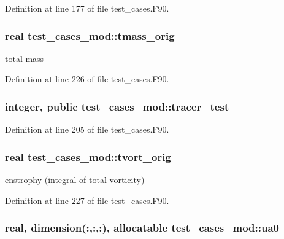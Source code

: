 Definition at line 177 of file test\-\_\-cases.\-F90.

\subsubsection[{tmass\-\_\-orig}]{\setlength{\rightskip}{0pt plus 5cm}real test\-\_\-cases\-\_\-mod\-::tmass\-\_\-orig\hspace{0.3cm}{\ttfamily [private]}}\label{classtest__cases__mod_af40da1fd7e6753224232eb5f50752dbf}


total mass 



Definition at line 226 of file test\-\_\-cases.\-F90.

\subsubsection[{tracer\-\_\-test}]{\setlength{\rightskip}{0pt plus 5cm}integer, public test\-\_\-cases\-\_\-mod\-::tracer\-\_\-test}\label{classtest__cases__mod_a045ac76cf8976a508e18b8f03ba2f57f}


Definition at line 205 of file test\-\_\-cases.\-F90.

\subsubsection[{tvort\-\_\-orig}]{\setlength{\rightskip}{0pt plus 5cm}real test\-\_\-cases\-\_\-mod\-::tvort\-\_\-orig\hspace{0.3cm}{\ttfamily [private]}}\label{classtest__cases__mod_a9e6b5dada32091330827cadf573e240a}


enstrophy (integral of total vorticity) 



Definition at line 227 of file test\-\_\-cases.\-F90.

\subsubsection[{ua0}]{\setlength{\rightskip}{0pt plus 5cm}real, dimension(\-:,\-:,\-:), allocatable test\-\_\-cases\-\_\-mod\-::ua0\hspace{0.3cm}{\ttfamily [private]}}\label{classtest__cases__mod_a732ccc75bb62730c4901b3197a4ca0db}


